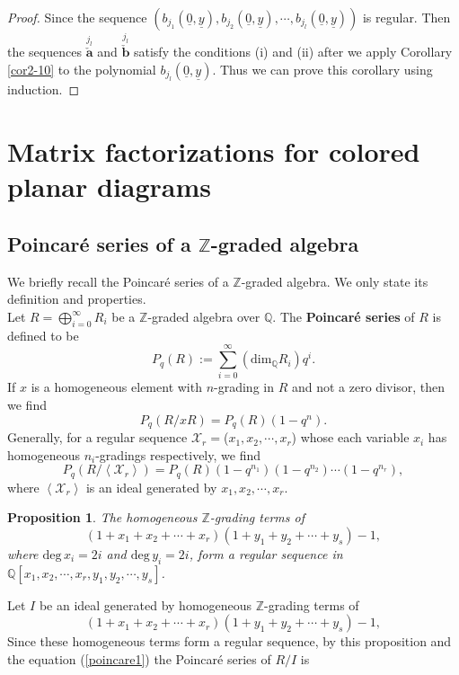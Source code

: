 \documentclass[10pt]{amsart}
\theoremstyle{break}
\newtheorem{pro}[de]{Proposition}
\begin{document}
\begin{proof}
Since the sequence $(b_{j_1}(\underline{0},\underline{y}),b_{j_2}(\underline{0},\underline{y}),\cdots ,b_{j_l}(\underline{0},\underline{y}))$ is regular. Then the sequences $\stackrel{j_l}{\check{\mathbf{a}}}$ and $\stackrel{j_l}{\check{\mathbf{b}}}$ satisfy the conditions (i) and (ii) after we apply Corollary \ref{cor2-10} to the polynomial $b_{j_l}(\underline{0},\underline{y})$. Thus we can prove this corollary using induction.
\end{proof}

\section{Matrix factorizations for colored planar diagrams}\label{sec4}
\subsection{Poincar\'e series of a ${{\mathbb{Z}}}$-graded algebra}\label{Poincare}
We briefly recall the Poincar\'e series of a ${{\mathbb{Z}}}$-graded algebra. 
We only state its definition and properties.\\
\indent
Let $\displaystyle R=\bigoplus_{i=0}^{\infty} R_i$ be a ${{\mathbb{Z}}}$-graded algebra over ${{\mathbb{Q}}}$. The {\bf Poincar\'e series} of $R$ is defined to be
$$
P_q(R):=\sum_{i=0}^{\infty} ({{\mathrm{dim}}}_{{\mathbb{Q}}} R_i) q^i.
$$
If $x$ is a homogeneous element with $n$-grading in $R$ and not a zero divisor, then we find
$$
P_q(R/xR)=P_q(R)(1-q^n).
$$
Generally, for a regular sequence $\mathcal{X}_r=$($x_1,x_2,\cdots ,x_r$) whose each variable $x_i$ has homogeneous $n_i$-gradings respectively, we find
\begin{equation}
\label{poincare1} P_q(R/\left< \mathcal{X}_r \right>)=P_q(R)(1-q^{n_1})(1-q^{n_2})\cdots (1-q^{n_r}),
\end{equation}
where $\left< \mathcal{X}_r \right>$ is an ideal generated by $x_1,x_2,\cdots ,x_r$.
\begin{pro}\label{poincare3}
The homogeneous ${{\mathbb{Z}}}$-grading terms of 
$$
(1+ x_1+x_2+\cdots +x_r )(1+ y_1+y_2+\cdots +y_s)-1,
$$
where ${{\mathrm{deg}}} \, x_i =2i$ and ${{\mathrm{deg}}} \, y_i =2i$, form a regular sequence in ${{\mathbb{Q}}} [x_1,x_2,\cdots ,x_r,y_1,y_2,\cdots ,y_s]$.
\end{pro}
Let $I$ be an ideal generated by homogeneous ${{\mathbb{Z}}}$-grading terms of 
$$
(1+ x_1+x_2+\cdots +x_r )(1+ y_1+y_2+\cdots +y_s)-1,
$$ 
Since these homogeneous terms form a regular sequence, by this proposition and the equation (\ref{poincare1}) the Poincar\'e series of $R/I$ is
\end{document}
